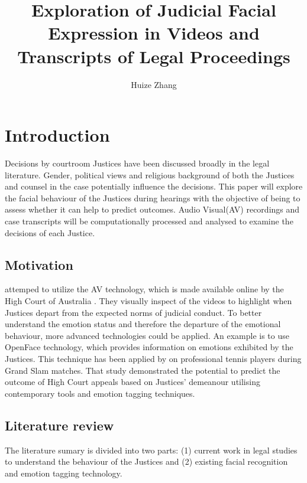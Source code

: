 \documentclass{monashthesis}
\author{Huize Zhang}
\title{Exploration of Judicial Facial Expression in Videos and Transcripts of Legal Proceedings}
\begin{document}

\titlepage

{\sf\tighttoc\doublespacing}

\clearpage{}\setcounter{page}{0}

\hypertarget{ch:intro}{%
\chapter{Introduction}\label{ch:intro}}

Decisions by courtroom Justices have been discussed broadly in the legal literature. Gender, political views and religious background of both the Justices and counsel in the case potentially influence the decisions. This paper will explore the facial behaviour of the Justices during hearings with the objective of being to assess whether it can help to predict outcomes. Audio Visual(AV) recordings and case transcripts will be computationally processed and analysed to examine the decisions of each Justice.

\hypertarget{motivation}{%
\section{Motivation}\label{motivation}}

\textcite{tutton2018judicial} attemped to utilize the AV technology, which is made available online by the High Court of Australia \autocite{highcourtau}. They visually inspect of the videos to highlight when Justices depart from the expected norms of judicial conduct. To better understand the emotion status and therefore the departure of the emotional behaviour, more advanced technologies could be applied. An example is to use OpenFace \autocite*{baltrusaitis2018openface} technology, which provides information on emotions exhibited by the Justices. This technique has been applied by \textcite{kovalchik2018going} on professional tennis players during Grand Slam matches. That study demonstrated the potential to predict the outcome of High Court appeals based on Justices' demeanour utilising contemporary tools and emotion tagging techniques.

\hypertarget{literature-review}{%
\section{Literature review}\label{literature-review}}

The literature sumary is divided into two parts: (1) current work in legal studies to understand the behaviour of the Justices and (2) existing facial recognition and emotion tagging technology.
\end{document}
